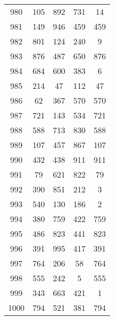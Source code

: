 \documentclass[a4paper,10pt,ngerman]{scrartcl}
\begin{document}
\begin{longtable}[c]{c|c|c|c|c}
    980 & 105 & 892 & 731 & 14 \\
    981 & 149 & 946 & 459 & 459 \\
    982 & 801 & 124 & 240 & 9 \\
    983 & 876 & 487 & 650 & 876 \\
    984 & 684 & 600 & 383 & 6 \\
    985 & 214 & 47 & 112 & 47 \\
    986 & 62 & 367 & 570 & 570 \\
    987 & 721 & 143 & 534 & 721 \\
    988 & 588 & 713 & 830 & 588 \\
    989 & 107 & 457 & 867 & 107 \\
    990 & 432 & 438 & 911 & 911 \\
    991 & 79 & 621 & 822 & 79 \\
    992 & 390 & 851 & 212 & 3 \\
    993 & 540 & 130 & 186 & 2 \\
    994 & 380 & 759 & 422 & 759 \\
    995 & 486 & 823 & 441 & 823 \\
    996 & 391 & 995 & 417 & 391 \\
    997 & 764 & 206 & 58 & 764 \\
    998 & 555 & 242 & 5 & 555 \\
    999 & 343 & 663 & 421 & 1 \\
    1000 & 794 & 521 & 381 & 794
\end{longtable}
\end{document}
